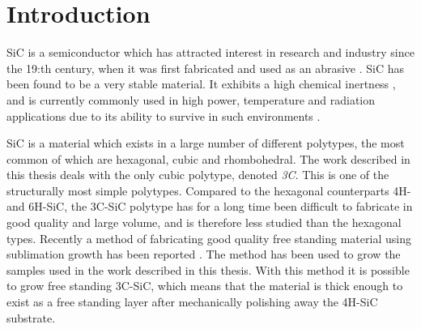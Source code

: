 
\chapter{Introduction}






SiC is a semiconductor which has attracted interest in research and industry since the 19:th century, when it was first fabricated and used as an abrasive \cite{Acheson1893}. SiC has been found to be a very stable material. It exhibits a high chemical inertness \cite{Hume1941}, and is currently commonly used in high power, temperature and radiation applications due to its ability to survive in such environments \cite{J.B.CASADYandR.W.JOHNSON1996}. 

SiC is a material which exists in a large number of different polytypes, the most common of which are hexagonal, cubic and rhombohedral. The work described in this thesis deals with the only cubic polytype, denoted \emph{3C}. This is one of the structurally most simple polytypes. Compared to the hexagonal counterparts 4H- and 6H-SiC, the 3C-SiC polytype has for a long time been difficult to fabricate in good quality and large volume, and is therefore less studied than the hexagonal types. Recently a method of fabricating good quality free standing material using sublimation growth has been reported \cite{Jokubavicius2014}. The method has been used to grow the samples used in the work described in this thesis. With this method it is possible to grow free standing 3C-SiC, which means that the material is thick enough to exist as a free standing layer after mechanically polishing away the 4H-SiC substrate. 

